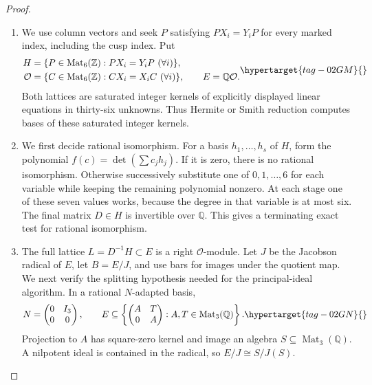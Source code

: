 \documentclass[11pt,a4paper]{article}
\numberwithin{equation}{section}
\theoremstyle{definition}
\begin{document}
\begin{proof}
\begin{enumerate}[label=\arabic*.]
\item We use column vectors and seek $P$ satisfying $PX_i=Y_iP$ for every
marked index, including the cusp index. Put
\begin{equation}
\begin{aligned}
 H&=\{P\in\operatorname{Mat}_6(\mathbb Z):PX_i=Y_iP\ (\forall i)\},\\
 \mathcal O&=\{C\in\operatorname{Mat}_6(\mathbb Z):CX_i=X_iC\ (\forall i)\},
 \qquad E=\mathbb Q\mathcal O.
\end{aligned}                                                    \hypertarget{tag-02GM}{}\label{maps:eq:F.IC1}
\end{equation}
Both lattices are saturated integer kernels of explicitly displayed
linear equations in thirty-six unknowns. Thus Hermite or Smith reduction computes bases of these saturated
integer kernels.

\item We first decide rational isomorphism. For a basis $h_1,\ldots,h_s$ of
$H$, form the polynomial $f(c)=\det(\sum c_jh_j)$. If it is zero,
there is no rational isomorphism. Otherwise successively substitute
one of $0,1,\ldots,6$ for each variable while keeping the remaining
polynomial nonzero. At each stage one of these seven values works,
because the degree in that variable is at most six. The final matrix
$D\in H$ is invertible over $\mathbb Q$. This gives a terminating exact test for rational isomorphism.

\item The full lattice $L=D^{-1}H\subset E$ is a right $\mathcal O$-module.
Let $J$ be the Jacobson radical of $E$, let $B=E/J$, and use bars
for images under the quotient map. We next verify the splitting
hypothesis needed for the principal-ideal algorithm. In a rational
$N$-adapted basis,
\begin{equation}
 N=\begin{pmatrix}0&I_3\\0&0\end{pmatrix},\qquad
 E\subseteq
 \left\{\begin{pmatrix}A&T\\0&A\end{pmatrix}:A,T\in
                                      \operatorname{Mat}_3(\mathbb Q)\right\}.
                                                               \hypertarget{tag-02GN}{}\label{maps:eq:F.IC2}
\end{equation}
Projection to $A$ has square-zero kernel and image an algebra
$S\subseteq\operatorname{Mat}_3(\mathbb Q)$. A nilpotent ideal is
contained in the radical, so $E/J\cong S/J(S)$.


\end{enumerate}
\end{proof}
\end{document}
